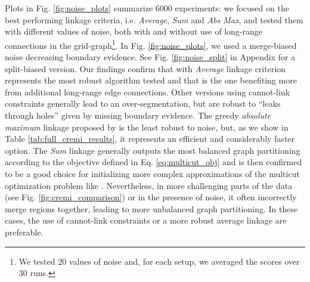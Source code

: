 Plots in Fig. \ref{fig:noise_plots} summarize 6000 experiments: we focused on the best performing linkage criteria, i.e. \emph{Average}, \emph{Sum} and \emph{Abs Max}, and tested them with different values of noise, both with and without use of long-range connections in the grid-graph\footnote{We tested 20 values of noise and, for each setup, we averaged the scores over 30 runs.}. In Fig. \ref{fig:noise_plots}, we used a merge-biased noise decreasing boundary evidence. See Fig. \ref{fig:noise_split} in Appendix for a split-biased version. 
Our findings confirm that \algname{} with \emph{Average} linkage criterion represents the most robust algorithm tested and that is the one benefiting more from additional long-range edge connections. Other versions using cannot-link constraints generally lead to an over-segmentation, but are robust to ``leaks through holes'' given by missing boundary evidence. The greedy \emph{absolute maximum} linkage proposed by \cite{wolf2018mutex} is the least robust to noise, but, as we show in Table \ref{tab:full_cremi_results}, it represents an efficient and considerably faster option.   
The \emph{Sum} linkage generally outputs the most balanced graph partitioning according to the objective defined in Eq. \ref{eq:multicut_obj} and is then confirmed to be a good choice for initializing more complex approximations of the multicut optimization problem like \cite{beier2016efficient}. Nevertheless, in more challenging parts of the data (see Fig. \ref{fig:cremi_comparison}) or in the presence of noise, it often incorrectly merge regions together, leading to more unbalanced graph partitioning. In these cases, the use of cannot-link constraints or a more robust average linkage are preferable.  


